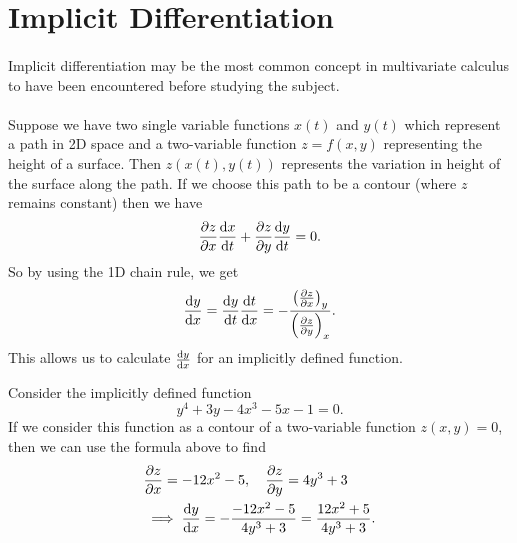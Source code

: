 \documentclass[../multivariate_calculus.tex]{subfiles}
\begin{document}
    \section{Implicit Differentiation}
        \paragraph{}
        Implicit differentiation may be the most common concept in multivariate calculus to have been encountered before studying the subject.
        
        \paragraph{}
        Suppose we have two single variable functions $x(t)$ and $y(t)$ which represent a path in 2D space and a two-variable function $z=f(x,y)$ representing the height of a surface. 
        Then $z(x(t),y(t))$ represents the variation in height of the surface along the path.
        If we choose this path to be a contour (where $z$ remains constant) then we have
        \begin{equation}
            \pdv{z}{x}\dv{x}{t}+\pdv{z}{y}\dv{y}{t}=0.
        \end{equation}
        So by using the 1D chain rule, we get
        \begin{equation}
            \dv{y}{x}=\dv{y}{t}\dv{t}{x}=-\frac{\left(\pdv{z}{x}\right)_y}{\left(\pdv{z}{y}\right)_x}.
        \end{equation}
        This allows us to calculate $\dv{y}{x}$ for an implicitly defined function.
        \begin{example}
            Consider the implicitly defined function
            \begin{equation}
                y^4+3y-4x^3-5x-1=0.
            \end{equation}
            If we consider this function as a contour of a two-variable function $z(x,y)=0$, then we can use the formula above to find
            \begin{align}
                &\pdv{z}{x}=-12x^2-5,\quad\pdv{z}{y}=4y^3+3\\
                &\implies\dv{y}{x}=-\frac{-12x^2-5}{4y^3+3}=\frac{12x^2+5}{4y^3+3}.
            \end{align}
        \end{example}
\end{document}
